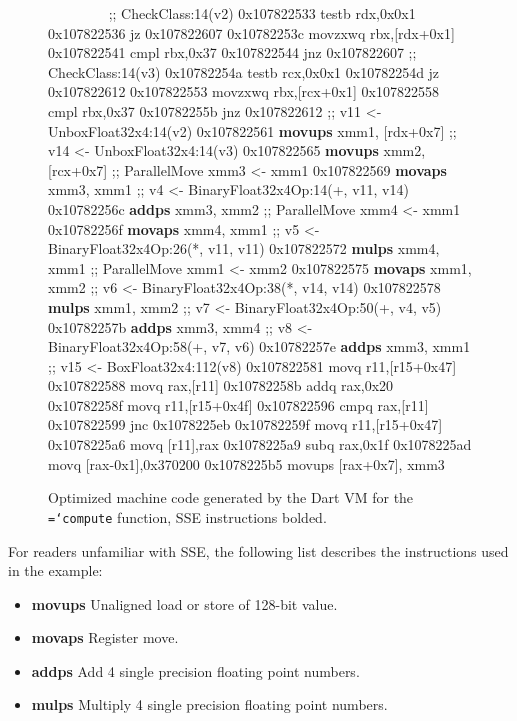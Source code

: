 \documentclass{sigplanconf}
\newcommand{\ttt}[1]{{\texttt{\hyphenchar\font=`\-\relax #1}}}%
\begin{document}
\begin{figure}[t]
\begin{small}
\begin{program}[style=tt]
\ \ \ \ \ \ \ \ \tab{}
        ;; CheckClass:14(v2)\untab{}
0x107822533 testb rdx,0x0x1
0x107822536 jz 0x107822607
0x10782253c movzxwq rbx,[rdx+0x1]
0x107822541 cmpl rbx,0x37
0x107822\tab{}544 jnz 0x107822607
        ;; CheckClass:14(v3)\untab{}
0x10782254a testb rcx,0x0x1
0x10782254d jz 0x107822612
0x107822553 movzxwq rbx,[rcx+0x1]
0x107822558 cmpl rbx,0x37
0x107822\tab{}55b jnz 0x107822612
        ;; v11 <- UnboxFloat32x4:14(v2)\untab{}
0x107822\tab{}561 \textbf{movups} xmm1, [rdx+0x7]
        ;; v14 <- UnboxFloat32x4:14(v3)\untab{}
0x107822\tab{}565 \textbf{movups} xmm2, [rcx+0x7]
        ;; ParallelMove xmm3 <- xmm1\untab{}
0x107822\tab{}569 \textbf{movaps} xmm3, xmm1
        ;; v4 <- BinaryFloat32x4Op:14(+, v11, v14)\untab{}
0x107822\tab{}56c \textbf{addps} xmm3, xmm2
        ;; ParallelMove xmm4 <- xmm1\untab{}
0x107822\tab{}56f \textbf{movaps} xmm4, xmm1
        ;; v5 <- BinaryFloat32x4Op:26(*, v11, v11)\untab{}
0x107822\tab{}572 \textbf{mulps} xmm4, xmm1
        ;; ParallelMove xmm1 <- xmm2\untab{}
0x107822\tab{}575 \textbf{movaps} xmm1, xmm2
        ;; v6 <- BinaryFloat32x4Op:38(*, v14, v14)\untab{}
0x107822\tab{}578 \textbf{mulps} xmm1, xmm2
        ;; v7 <- BinaryFloat32x4Op:50(+, v4, v5)\untab{}
0x107822\tab{}57b \textbf{addps} xmm3, xmm4
        ;; v8 <- BinaryFloat32x4Op:58(+, v7, v6)\untab{}
0x107822\tab{}57e \textbf{addps} xmm3, xmm1
        ;; v15 <- BoxFloat32x4:112(v8)\untab{}
0x107822581 movq r11,[r15+0x47]
0x107822588 movq rax,[r11]
0x10782258b addq rax,0x20
0x10782258f movq r11,[r15+0x4f]
0x107822596 cmpq rax,[r11]
0x107822599 jnc 0x1078225eb
0x10782259f  movq r11,[r15+0x47]
0x1078225a6 movq [r11],rax
0x1078225a9 subq rax,0x1f
0x1078225ad movq [rax-0x1],0x370200
0x1078225b5 movups [rax+0x7], xmm3
\end{program}
\end{small}
\caption{Optimized machine code generated by the Dart VM for the \ttt{compute}
function, SSE instructions bolded.}
\label{fig:asm}
\end{figure}

For readers unfamiliar with SSE, the following list describes the instructions
used in the example:

\begin{itemize}
\item \textbf{movups} Unaligned load or store of 128-bit value.
\item \textbf{movaps} Register move.
\item \textbf{addps} Add 4 single precision floating point numbers.
\item \textbf{mulps} Multiply 4 single precision floating point numbers.
\end{itemize}
\end{document}
